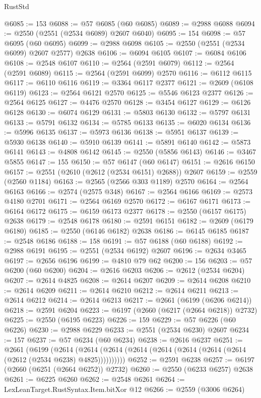 \begin{lexlean}{RustStd}
\begin{coremodule}
@6085 := 153
@6088 := @57 @6085 (@60 @6085)
@6089 := @2988 @6088
@6094 := @2550 (@2551 (@2534 @6089) @2607 @6040)
@6095 := 154
@6098 := @57 @6095 (@60 @6095)
@6099 := @2988 @6098
@6105 := @2550 (@2551 (@2534 @6099) @2607 @2577) @2638
@6106 := @6094 @6105
@6107 := @6084 @6106
@6108 := @2548 @6107
@6110 := @2564 (@2591 @6079)
@6112 := @2564 (@2591 @6089)
@6115 := @2564 (@2591 @6099) @2570
@6116 := @6112 @6115
@6117 := @6110 @6116
@6119 := @3364 @6117 @2377
@6121 := @2609 (@6108 @6119)
@6123 := @2564 @6121 @2570
@6125 := @5546 @6123 @2377
@6126 := @2564 @6125
@6127 := @4476 @2570
@6128 := @3454 @6127
@6129 := @6126 @6128
@6130 := @6074 @6129
@6131 := @5803 @6130
@6132 := @5797 @6131
@6133 := @5791 @6132
@6134 := @5785 @6133
@6135 := @6020 @6134
@6136 := @5996 @6135
@6137 := @5973 @6136
@6138 := @5951 @6137
@6139 := @5930 @6138
@6140 := @5910 @6139
@6141 := @5891 @6140
@6142 := @5873 @6141
@6143 := @4808 @6142
@6145 := @2550 (@5856 @6143)
@6146 := @3467 @5855
@6147 := 155
@6150 := @57 @6147 (@60 @6147)
@6151 := @2616 @6150
@6157 := @2551 (@2610 (@2612 (@2534 @6151) @2688)) @2607
@6159 := @2559 (@2560 @1184)
@6163 := @2565 (@2566 @303 @1189) @2570
@6164 := @2564 @6163
@6166 := @2574 (@2575 @348)
@6167 := @2564 @6166
@6169 := @2573 @4180 @2701
@6171 := @2564 @6169 @2570
@6172 := @6167 @6171
@6173 := @6164 @6172
@6175 := @6159 @6173 @2377
@6178 := @2550 (@6157 @6175) @2638
@6179 := @2548 @6178
@6180 := @2591 @6151
@6182 := @2609 (@6179 @6180)
@6185 := @2550 (@6146 @6182) @2638
@6186 := @6145 @6185
@6187 := @2548 @6186
@6188 := 158
@6191 := @57 @6188 (@60 @6188)
@6192 := @2988 @6191
@6195 := @2551 (@2534 @6192) @2607
@6196 := @2634 @3465
@6197 := @2656 @6196
@6199 := @4810 @79 @62
@6200 := 156
@6203 := @57 @6200 (@60 @6200)
@6204 := @2616 @6203
@6206 := @2612 (@2534 @6204)
@6207 := @2614 @4825
@6208 := @2614 @6207
@6209 := @2614 @6208
@6210 := @2614 @6209
@6211 := @2614 @6210
@6212 := @2614 @6211
@6213 := @2614 @6212
@6214 := @2614 @6213
@6217 := @2661 (@6199 (@6206 @6214))
@6218 := @2591 @6204
@6223 := @6197 (@2660 (@6217 (@2664 @6218)) @2732)
@6225 := @2550 (@6195 @6223)
@6226 := 159
@6229 := @57 @6226 (@60 @6226)
@6230 := @2988 @6229
@6233 := @2551 (@2534 @6230) @2607
@6234 := 157
@6237 := @57 @6234 (@60 @6234)
@6238 := @2616 @6237
@6251 := @2661
    (@6199
      (@2614 (@2614 (@2614 (@2614 (@2614 (@2614 (@2614 (@2614 (@2612 (@2534 @6238) @4825))))))))))
@6252 := @2591 @6238
@6257 := @6197 (@2660 (@6251 (@2664 @6252)) @2732)
@6260 := @2550 (@6233 @6257) @2638
@6261 := @6225 @6260
@6262 := @2548 @6261
@6264 := LexLeanTarget.RustSyntax.Item.bitXor @12
@6266 := @2559 (@3006 @6264)

\end{coremodule}
\end{lexlean}
